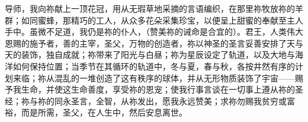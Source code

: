 导师，我向祢献上一顶花冠，\newline{}用从无瑕草地采摘的言语编织，\newline{}在那里祢牧放祢的羊群；如同蜜蜂，\newline{}那精巧的工人，从众多花朵\newline{}采集珍宝，以便呈上\newline{}甜蜜的奉献至主人手中。\newline{}虽微不足道，我仍是祢的仆人，\newline{}（赞美祢的诫命是合宜的）。\newline{}君王，人类伟大恩赐的施予者，\newline{}善的主宰，圣父，万物的创造者，\newline{}祢以神圣的圣言\newline{}妥善安排了天与天的装饰，独自成就；\newline{}祢带来了阳光与白昼；\newline{}祢为星辰设定了轨道，\newline{}以及大地与海洋如何保持位置；\newline{}当季节在其循环的轨道中，\newline{}冬与夏，春与秋，各按\newline{}井然有序的计划来临；\newline{}祢从混乱的一堆创造了\newline{}这有秩序的球体，并从无形物质\newline{}装饰了宇宙——\newline{}赐予我生命，并使这生命善度，\newline{}享受祢的恩宠；使我行事言谈\newline{}在一切事上遵从祢的圣经；\newline{}祢与祢的同永圣言，全智，\newline{}从祢发出，愿我永远赞美；\newline{}求祢勿赐我贫穷或富裕，而是所需，\newline{}圣父，在人生中，然后安息离世。\par

